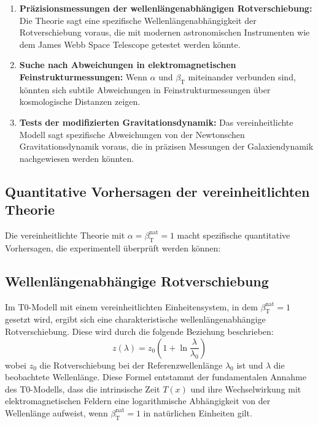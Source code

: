 \documentclass[12pt,a4paper]{article}
\newcommand{\Tfield}{T(x)}
\newcommand{\betaT}{\beta_{\text{T}}}
\begin{document}
	\begin{enumerate}
		\item \textbf{Präzisionsmessungen der wellenlängenabhängigen Rotverschiebung:} Die Theorie sagt eine spezifische Wellenlängenabhängigkeit der Rotverschiebung voraus, die mit modernen astronomischen Instrumenten wie dem James Webb Space Telescope getestet werden könnte.
		
		\item \textbf{Suche nach Abweichungen in elektromagnetischen Feinstrukturmessungen:} Wenn \(\alpha\) und \(\betaT\) miteinander verbunden sind, könnten sich subtile Abweichungen in Feinstrukturmessungen über kosmologische Distanzen zeigen.
		
		\item \textbf{Tests der modifizierten Gravitationsdynamik:} Das vereinheitlichte Modell sagt spezifische Abweichungen von der Newtonschen Gravitationsdynamik voraus, die in präzisen Messungen der Galaxiendynamik nachgewiesen werden könnten.
	\end{enumerate}
	
	\subsection{Quantitative Vorhersagen der vereinheitlichten Theorie}
	
	Die vereinheitlichte Theorie mit \(\alpha = \betaT^{\text{nat}} = 1\) macht spezifische quantitative Vorhersagen, die experimentell überprüft werden können:
	
	\subsection{Wellenlängenabhängige Rotverschiebung}
	
	Im T0-Modell mit einem vereinheitlichten Einheitensystem, in dem \(\betaT^{\text{nat}} = 1\) gesetzt wird, ergibt sich eine charakteristische wellenlängenabhängige Rotverschiebung. Diese wird durch die folgende Beziehung beschrieben:
	\begin{equation}
		z(\lambda) = z_0 \left(1 + \ln \frac{\lambda}{\lambda_0}\right)
	\end{equation}
	wobei \(z_0\) die Rotverschiebung bei der Referenzwellenlänge \(\lambda_0\) ist und \(\lambda\) die beobachtete Wellenlänge. Diese Formel entstammt der fundamentalen Annahme des T0-Modells, dass die intrinsische Zeit \(\Tfield\) und ihre Wechselwirkung mit elektromagnetischen Feldern eine logarithmische Abhängigkeit von der Wellenlänge aufweist, wenn \(\betaT^{\text{nat}} = 1\) in natürlichen Einheiten gilt.
	
\end{document}
